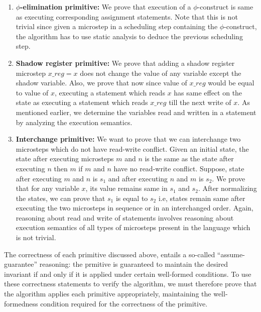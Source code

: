 \begin{enumerate}
\item {\bf $\phi$-elimination primitive:} We prove that execution
  of a $\phi$-construct is same as executing corresponding
  assignment statements. Note that this is not trivial since
  given a microstep in a scheduling step containing the
  $\phi$-construct, the algorithm has to use static analysis
  to deduce the previous scheduling step.

\item {\bf Shadow register primitive:} We prove that adding
  a shadow register microstep $x\_reg = x$ does not change the
  value of any variable except the shadow variable. Also, we
  prove that now since value of $x\_reg$ would be equal to value
  of $x$, executing a statement which reads $x$ has same
  effect on the state as executing a statement which reads
  $x\_reg$ till the next write of $x$. As mentioned earlier, we
  determine the variables read and written in a statement by
  analyzing the execution semantics.

\item {\bf Interchange primitive:} We want to prove that we can interchange two microsteps which do not have
  read-write conflict. Given an initial state, the state after
  executing microsteps $m$ and $n$ is the same as the state after
  executing $n$ then $m$ if $m$ and $n$ have no read-write
  conflict. Suppose, state after
  executing $m$ and $n$ is $s_1$ and after executing $n$ and
  $m$ is $s_2$. We prove that for any variable $x$, its
  value remains same in $s_1$ and $s_2$.  After normalizing
  the states, we can prove that $s_1$ is equal to $s_2$ i.e,
  states remain same after executing the two microsteps in
  sequence or in an interchanged order. Again, reasoning about read and
  write of statements involves reasoning about execution
  semantics of all types of microsteps present in the
  language which is not trivial.
\end {enumerate}

\medskip
{} The
correctness of each primitive discussed above, entails a
so-called ``assume-guarantee'' reasoning: the prmitive is
guaranteed to maintain the desired invariant if and only if
it is applied under certain well-formed conditions.  To use
these correctness statements to verify the algorithm, we
must therefore prove that the algorithm applies each
primitive appropriately, maintaining the well-formedness
condition required for the correctness of the primitive.

